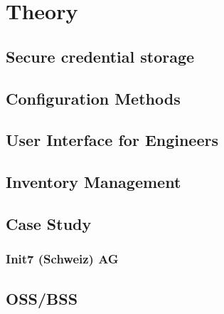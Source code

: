 \chapter{\label{theory}Theory}
\thispagestyle{fancy}




\section{Secure credential storage}



\section{Configuration Methods}


\section{User Interface for Engineers}

\section{Inventory Management}


\section{Case Study}

\subsection{Init7 (Schweiz) AG}


\section{OSS/BSS}


